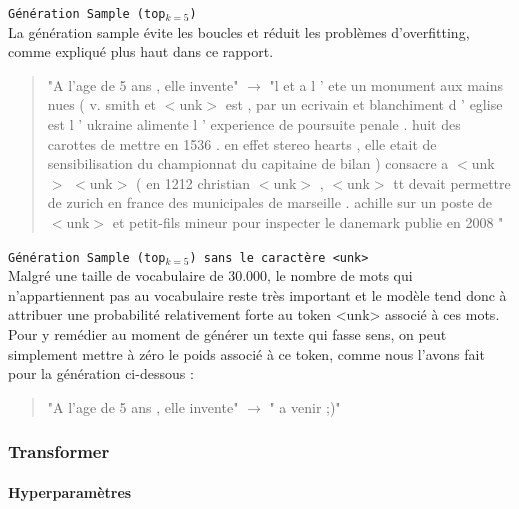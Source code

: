 \vspace{0.4cm}

\noindent{} \texttt{Génération Sample (top$_{k=5}$)}  \\

La génération sample évite les boucles et réduit les problèmes d'overfitting, comme expliqué plus haut dans ce rapport.

\begin{quotation}
"A l'age de 5 ans , elle invente" $\rightarrow$ "l et a l ' ete un monument aux mains nues ( v. smith et $<$unk$>$ est , par un ecrivain et blanchiment d ' eglise est l ' ukraine alimente l ' experience de poursuite penale . huit des carottes de mettre en 1536 . en effet stereo hearts , elle etait de sensibilisation du championnat du capitaine de bilan ) consacre a $<$unk$>$ $<$unk$>$ ( en 1212 christian $<$unk$>$ , $<$unk$>$ tt devait permettre de zurich en france des municipales de marseille . achille sur un poste de $<$unk$>$ et petit-fils mineur pour inspecter le danemark publie en 2008 "
\end{quotation}

\vspace{0.4cm}

\noindent{} \texttt{Génération Sample (top$_{k=5}$) sans le caractère <unk>}  \\

Malgré une taille de vocabulaire de 30.000, le nombre de mots qui n’appartiennent pas au vocabulaire reste très important et le modèle tend donc à attribuer une probabilité relativement forte au token <unk> associé à ces mots. Pour y remédier au moment de générer un texte qui fasse sens, on peut simplement mettre à zéro le poids associé à ce token, comme nous l’avons fait pour la génération ci-dessous :

\begin{quotation}
"A l'age de 5 ans , elle invente" $\rightarrow$ " a venir ;)"
\end{quotation}

\subsubsection{Transformer}

\paragraph{Hyperparamètres}

